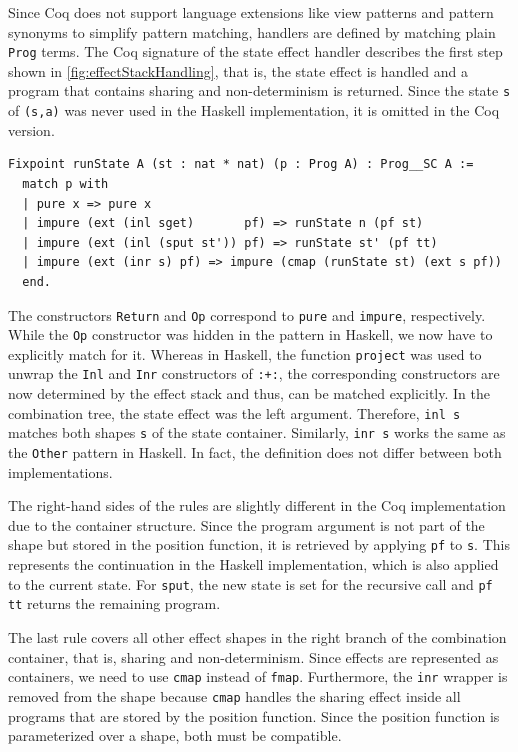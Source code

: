 \documentclass[a4paper, 11pt, fleqn, twoside]{scrreprt}
\newcommand{\hinl}[1]{\texttt{#1}}
\newcommand{\cinl}[1]{\texttt{#1}}
\begin{document}
Since Coq does not support language extensions like view patterns and pattern synonyms to simplify pattern matching, handlers are defined by matching plain \cinl{Prog} terms.
The Coq signature of the state effect handler describes the first step shown in \autoref{fig:effectStackHandling}, that is, the state effect is handled and a program that contains sharing and non-determinism is returned.
Since the state \hinl{s} of \hinl{(s,a)} was never used in the Haskell implementation, it is omitted in the Coq version.

\begin{verbatim}
Fixpoint runState A (st : nat * nat) (p : Prog A) : Prog__SC A :=
  match p with
  | pure x => pure x
  | impure (ext (inl sget)       pf) => runState n (pf st)
  | impure (ext (inl (sput st')) pf) => runState st' (pf tt)
  | impure (ext (inr s) pf) => impure (cmap (runState st) (ext s pf))
  end.
\end{verbatim}

The constructors \hinl{Return} and \hinl{Op} correspond to \cinl{pure} and \cinl{impure}, respectively.
While the \hinl{Op} constructor was hidden in the pattern in Haskell, we now have to explicitly match for it.
Whereas in Haskell, the function \hinl{project} was used to unwrap the \hinl{Inl} and \hinl{Inr} constructors of \hinl{:+:}, the corresponding constructors are now determined by the effect stack and thus, can be matched explicitly.
In the combination tree, the state effect was the left argument.
Therefore, \cinl{inl s} matches both shapes \cinl{s} of the state container.
Similarly, \cinl{inr s} works the same as the \hinl{Other} pattern in Haskell.
In fact, the definition does not differ between both implementations.

The right-hand sides of the rules are slightly different in the Coq implementation due to the container structure.
Since the program argument is not part of the shape but stored in the position function, it is retrieved by applying \cinl{pf} to \cinl{s}.
This represents the continuation in the Haskell implementation, which is also applied to the current state.
For \cinl{sput}, the new state is set for the recursive call and \cinl{pf tt} returns the remaining program.

The last rule covers all other effect shapes in the right branch of the combination container, that is, sharing and non-determinism.
Since effects are represented as containers, we need to use \cinl{cmap} instead of \cinl{fmap}.
Furthermore, the \cinl{inr} wrapper is removed from the shape because \cinl{cmap} handles the sharing effect inside all programs that are stored by the position function.
Since the position function is parameterized over a shape, both must be compatible.
\end{document}
